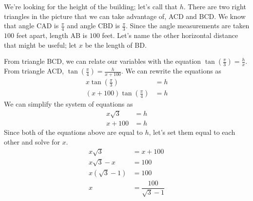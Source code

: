 \documentclass{article}
\begin{document}
\begin{enumerate}

\begin{solution}

      We're looking for the height of the building; let's call that $h$.
      There are two right triangles in the picture that we can take
      advantage of, ACD and BCD. We know that angle CAD is $\frac{\pi}{4}$ and
      angle CBD is $\frac{\pi}{3}$. Since the angle measurements are taken
      $100$ feet apart, length AB is $100$ feet.
      Let's name the other horizontal distance that might be
      useful; let $x$ be the length of BD.
      \begin{center}
      \end{center}
      From triangle BCD, we can relate our variables with the equation
       $\tan \left(\frac{\pi}{3}\right) = \frac{h}{x}$.
      From triangle ACD,
      $\tan \left(\frac{\pi}{4}\right) = \frac{h}{x + 100}$.
      We can rewrite the equations as
      \begin{align*}
        x \tan \left(\frac{\pi}{3}\right) &= h \\
        (x + 100) \tan \left(\frac{\pi}{4}\right) &= h
        \end{align*}
        We can simplify the system of equations as
      \begin{align*}
        x \sqrt{3} &= h \\
        x + 100 &= h
        \end{align*}
    Since both of the equations above are equal to $h$, let's set them equal to each other and solve for $x$.
    \begin{align*}
        x \sqrt{3} &= x + 100 \\
        x \sqrt{3} -x &= 100 \\
        x (\sqrt{3} -1) &= 100 \\
        x &= \dfrac{100}{\sqrt{3} -1}
        \end{align*}
   

\end{solution}
\end{enumerate}
\end{document}
